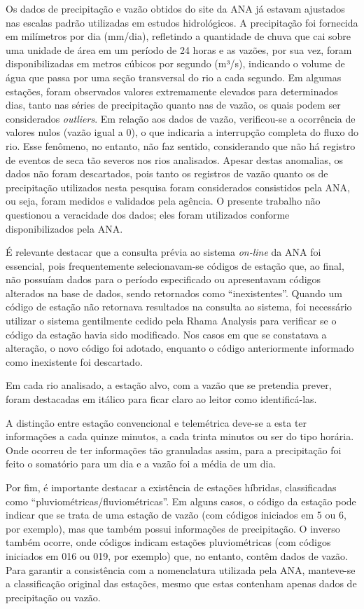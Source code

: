 Os dados de precipitação e vazão obtidos do site da ANA já estavam ajustados nas escalas padrão utilizadas em estudos hidrológicos. A precipitação foi fornecida em milímetros por dia (mm/dia), refletindo a quantidade de chuva que cai sobre uma unidade de área em um período de 24 horas e as vazões, por sua vez, foram disponibilizadas em metros cúbicos por segundo (m³/s), indicando o volume de água que passa por uma seção transversal do rio a cada segundo. Em algumas estações, foram observados valores extremamente elevados para determinados dias, tanto nas séries de precipitação quanto nas de vazão, os quais podem ser considerados \textit{outliers}. Em relação aos dados de vazão, verificou-se a ocorrência de valores nulos (vazão igual a 0), o que indicaria a interrupção completa do fluxo do rio. Esse fenômeno, no entanto, não faz sentido, considerando que não há registro de eventos de seca tão severos nos rios analisados. Apesar destas anomalias, os dados não foram descartados, pois tanto os registros de vazão quanto os de precipitação utilizados nesta pesquisa foram considerados consistidos pela ANA, ou seja, foram medidos e validados pela agência. O presente trabalho não questionou a veracidade dos dados; eles foram utilizados conforme disponibilizados pela ANA.

É relevante destacar que a consulta prévia ao sistema \textit{on-line} da ANA foi essencial, pois frequentemente selecionavam-se códigos de estação que, ao final, não possuíam dados para o período especificado ou apresentavam códigos alterados na base de dados, sendo retornados como ``inexistentes''. Quando um código de estação não retornava resultados na consulta ao sistema, foi necessário utilizar o sistema gentilmente cedido pela Rhama Analysis para verificar se o código da estação havia sido modificado. Nos casos em que se constatava a alteração, o novo código foi adotado, enquanto o código anteriormente informado como inexistente foi descartado.

Em cada rio analisado, a estação alvo, com a vazão que se pretendia prever, foram destacadas em itálico para ficar claro ao leitor como identificá-las.

A distinção entre estação convencional e telemétrica deve-se a esta ter informações a cada quinze minutos, a cada trinta minutos ou ser do tipo horária. Onde ocorreu de ter informações tão granuladas assim, para a precipitação foi feito o somatório para um dia e a vazão foi a média de um dia.

Por fim, é importante destacar a existência de estações híbridas, classificadas como ``pluviométricas/fluviométricas''. Em alguns casos, o código da estação pode indicar que se trata de uma estação de vazão (com códigos iniciados em 5 ou 6, por exemplo), mas que também possui informações de precipitação. O inverso também ocorre, onde códigos indicam estações pluviométricas (com códigos iniciados em 016 ou 019, por exemplo) que, no entanto, contêm dados de vazão. Para garantir a consistência com a nomenclatura utilizada pela ANA, manteve-se a classificação original das estações, mesmo que estas contenham apenas dados de precipitação ou vazão.

